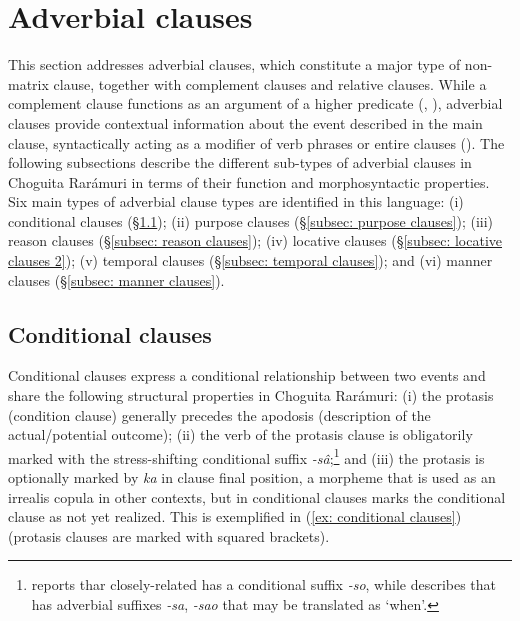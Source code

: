 \section{Adverbial clauses}
\label{sec: adverbial clauses}

This section addresses adverbial clauses, which
constitute a major type of non-matrix clause,
together with complement clauses and relative clauses. While a complement clause functions as an argument of a higher predicate (\citealt{cristofaro2005subordination}, \citealt{noonan2007complementation}), adverbial clauses provide contextual information about the event described in the main clause, syntactically acting as a modifier of verb phrases or entire clauses (\citealt{thompson1985adverbial}). The following subsections describe the different sub-types of adverbial clauses in Choguita Rarámuri in terms of their function and morphosyntactic properties. Six main types of adverbial clause types are identified in this language: (i) conditional clauses (§\ref{subsec: conditional clauses}); (ii) purpose clauses (§\ref{subsec: purpose clauses}); (iii) reason clauses (§\ref{subsec: reason clauses}); (iv) locative clauses (§\ref{subsec: locative clauses 2}); (v) temporal clauses (§\ref{subsec: temporal clauses}); and (vi) manner clauses (§\ref{subsec: manner clauses}).

\subsection{Conditional clauses}
\label{subsec: conditional clauses}
\largerpage[2]
Conditional clauses express a conditional relationship between two events and share the following structural properties in Choguita Rarámuri: (i) the protasis (condition clause) generally precedes the apodosis (description of the actual\slash potential outcome); (ii) the verb of the protasis clause is obligatorily marked with the stress-shifting conditional suffix \textit{-sâ};\footnote{\citet{felix2006grammar} reports thar closely-related  has a conditional suffix \textit{-so}, while \citet{miller1996guarijio} describes that  has adverbial suffixes \textit{-sa}, \textit{-sao} that may be translated as `when'.} and (iii) the protasis is optionally marked by \textit{ka} in clause final position, a morpheme that is used as an irrealis copula in other contexts, but in conditional clauses marks the conditional clause as not yet realized. This is exemplified in (\ref{ex: conditional clauses}) (protasis clauses are marked with squared brackets).

